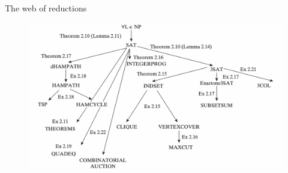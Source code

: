 \documentclass[presentation]{beamer}
\begin{document}
\begin{frame}[label={sec:org5a3a71b}]{The web of reductions}
\begin{figure}[htbp]
\centering
\includegraphics[width=.8\textwidth]{./3.pdf}
\label{}
\end{figure}
\end{frame}
\end{document}
